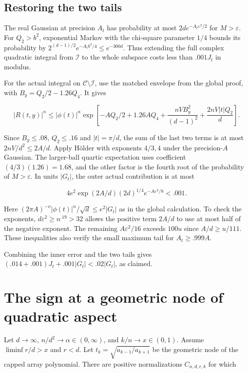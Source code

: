 \documentclass[11pt]{article}
\begin{document}
\subsection{Restoring the two tails}

The real Gaussian at precision $A_t$ has probability at most
$2d e^{-A_t\varepsilon^2/2}$ for $M>\varepsilon$.
For $Q_2>b^2$, exponential Markov with the chi-square parameter
$1/4$ bounds its probability by
$2^{(d-1)/2}e^{-A_t b^2/4}\le e^{-300d}$.
Thus extending the full complex quadratic integral from
$\mathcal I$ to the whole subspace costs less than $.001J_t$
in modulus.

For the actual integral on $\mathcal C\setminus\mathcal I$, use
the matched envelope from the global proof, with
$B_y=Q_2/2-1.26 Q_4$. It gives

\[
|R(t,y)|^n\le|\phi(t)|^n
\exp\left[-A Q_2/2+1.26A Q_4
 +\frac{nV B_y^2}{(d-1)^2}+\frac{2nV|t|Q_2}{d}\right].
\]

Since $B_y\le .08$, $Q_2\le .16$ and $|t|=\pi/d$,
the sum of the last two terms is at most $2nV/d^2\le2 A/d$.
Apply Hölder with exponents $4/3,4$ under the precision-$A$
Gaussian. The larger-ball quartic expectation uses coefficient
$(4/3)(1.26)=1.68$, and the other factor is the fourth root of
the probability of $M>\varepsilon$. In units $|G_t|$, the outer
actual contribution is at most

\[
4e^2\exp(2A/d)(2d)^{1/4}e^{-A\varepsilon^2/8}<.001 .
\]

Here $(2\pi A)^{-\nu}|\phi(t)|^n/\sqrt d\le e^2|G_t|$
as in the global calculation. To check the exponents,
$d\varepsilon^2\ge n^{.19}>32$ allows the positive term
$2A/d$ to use at most half of the negative exponent.
The remaining $A\varepsilon^2/16$ exceeds $100u$
since $A/d\ge u/111$. These inequalities also verify the
small maximum tail for $A_t\ge.999 A$.

Combining the inner error and the two tails gives
$(.014+.001)J_t+.001|G_t|<.02|G_t|$, as claimed.

\section{The sign at a geometric node of quadratic aspect}

Let $d\to\infty$, $n/d^2\to\alpha\in(0,\infty)$, and $k/n\to x\in(0,1)$. Assume $\liminf r/d>x$ and $r<d$. Let $t_k=\sqrt{a_{k-1}/a_{k+1}}$ be the geometric node of the capped array polynomial. There are positive normalizations $C_{n,d,r,k}$ for which
\end{document}
